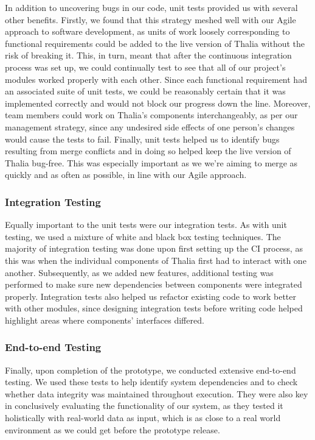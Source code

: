 \documentclass[main.tex]{subfiles}
\begin{document}
In addition to uncovering bugs in our code, unit tests provided us with several other benefits. 
Firstly, we found that this strategy meshed well with our Agile approach to software development, as units of work loosely corresponding to functional requirements could be added to the live version of Thalia without the risk of breaking it. This, in turn, meant that after the continuous integration process was set up, we could continually test to see that all of our project's modules worked properly with each other. Since each functional requirement had an associated suite of unit tests, we could be reasonably certain that it was implemented correctly and would not block our progress down the line. 
Moreover, team members could work on Thalia’s components interchangeably, as per our management strategy, since any undesired side effects of one person’s changes would cause the tests to fail. 
Finally, unit tests helped us to identify bugs resulting from merge conflicts and in doing so helped keep the live version of Thalia bug-free. This was especially important as we we're aiming to merge as quickly and as often as possible, in line with our Agile approach.

\subsubsection{Integration Testing}
Equally important to the unit tests were our integration tests. As with unit testing, we used a mixture of white and black box testing techniques. The majority of integration testing was done upon first setting up the CI process, as this was when the individual components of Thalia first had to interact with one another. Subsequently, as we added new features, additional testing was performed to make sure new dependencies between components were integrated properly. Integration tests also helped us refactor existing code to work better with other modules, since designing integration tests before writing code helped highlight areas where components' interfaces differed.

\subsubsection{End-to-end Testing}
Finally, upon completion of the prototype, we conducted extensive end-to-end testing. We used these tests to help identify system dependencies and to check whether data integrity was maintained throughout execution. They were also key in conclusively evaluating the functionality of our system, as they tested it holistically with real-world data as input, which is as close to a real world environment as we could get before the prototype release.
\end{document}
